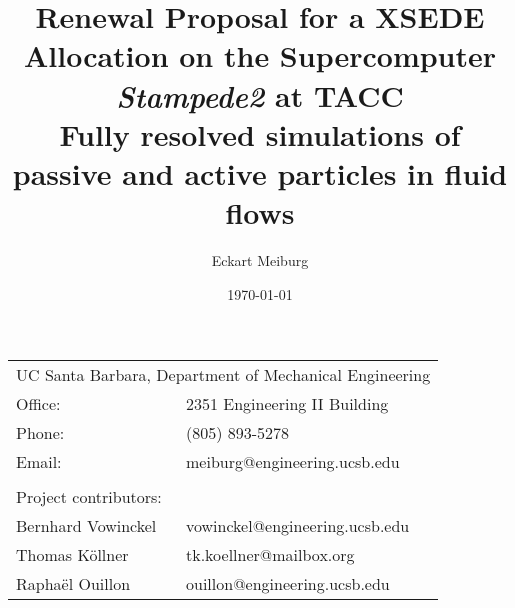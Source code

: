\documentclass[10pt]{article}
\title{Renewal Proposal for a XSEDE Allocation on the Supercomputer {\em Stampede2} at TACC\\
       \normalsize{\textbf{Fully resolved simulations of passive and active particles in fluid flows}}} %
\author{Eckart Meiburg} %
\date{\today} %
\begin{document}
\maketitle %

\begin{center}
\begin{tabular}{l l}
\multicolumn{2}{l}{UC Santa Barbara, Department of Mechanical Engineering} \\ %
Office:          & 2351 Engineering II Building \\
Phone:           & (805) 893-5278\\
Email:           & meiburg@engineering.ucsb.edu\\
\\
\multicolumn{2}{l}{Project contributors:} \\ %
Bernhard Vowinckel & vowinckel@engineering.ucsb.edu\\
Thomas K\"{o}llner    & tk.koellner@mailbox.org\\
Rapha\"{e}l Ouillon    & ouillon@engineering.ucsb.edu\\
\end{tabular}
\end{center}


\end{document}
